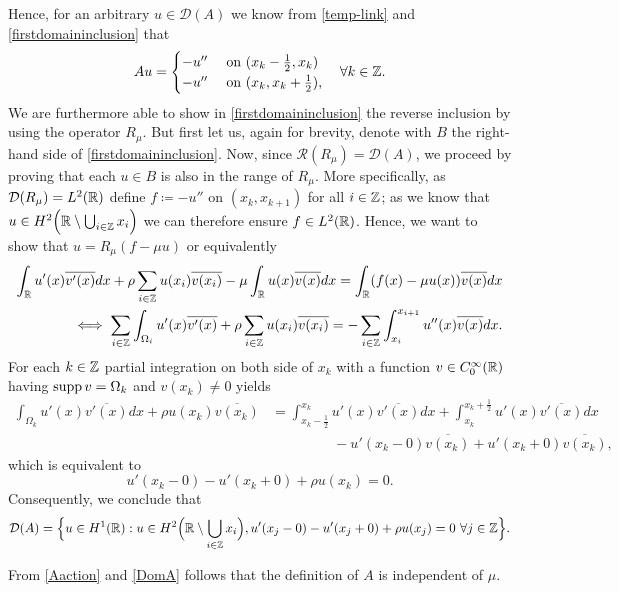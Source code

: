 Hence, for an arbitrary $u \in \mathcal{D}(A)$ we know from \eqref{temp-link} and \eqref{firstdomaininclusion} that
	\begin{equation}
		A u = \begin{cases}
					- u'' & \text{ on } (x_{k} - \frac{1}{2}, x_{k}) \\
					- u'' & \text{ on } (x_{k}, x_{k} + \frac{1}{2}),
			 \end{cases} \quad \forall k \in \mathbb{Z}. \label{Aaction}
	\end{equation} 
We are furthermore able to show in \eqref{firstdomaininclusion} the reverse inclusion by using the operator $R_{\mu}$. But first let us, again for brevity, denote with $B$ the right-hand side of \eqref{firstdomaininclusion}. Now, since $\mathcal{R}(R_{\mu}) = \mathcal{D}(A)$, we proceed by proving that each $u \in B$ is also in the range of $R_{\mu}$. More specifically, as $\mathcal{D}(R_{\mu}) = L^{2}(\mathbb{R})$ define $f \coloneqq - u''$ on $(x_{k}, x_{k + 1})$ for all $i \in \mathbb{Z}$; as we know that $u \in H^{2}\Big(\mathbb{R} \setminus \bigcup_{i \in \mathbb{Z}} x_{i} \Big)$ we can therefore ensure $f \in L^{2}(\mathbb{R})$. Hence, we want to show that $u = R_{\mu}(f - \mu u)$ or equivalently 
	\begin{align*}
		 \int_{\mathbb{R}} u'(x) \overline{v'(x)} dx + \rho \sum_{i \in \mathbb{Z}} u(x_{i}) \overline{v(x_{i})} - \mu \int_{\mathbb{R}} u(x) \overline{v(x)} dx = \int_{\mathbb{R}}(f(x)-\mu u(x)) \overline{v(x)} dx \\
		\iff \sum_{i \in \mathbb{Z}} \int_{\Omega_{i}} u'(x) \overline{v'(x)} + \rho \sum_{i \in \mathbb{Z}} u(x_{i}) \overline{v(x_{i})} = - \sum_{i \in \mathbb{Z}} \int_{x_{i}}^{x_{i+1}} u''(x) \overline{v(x)} dx.
	\end{align*}
For each $k \in \mathbb{Z}$ partial integration on both side of $x_{k}$ with a function $v \in C_{0}^{\infty}(\mathbb{R})$ having $\operatorname{supp} v = \Omega_{k}$ and $v(x_{k}) \neq 0$ yields
	\begin{align*}
		\int_{\Omega_{k}} u'(x) \overline{v'(x)} dx + \rho u(x_{k}) \overline{v(x_{k})} & = \int_{x_{k} - \frac{1}{2}}^{x_{k}} u'(x) \overline{v'(x)} dx + \int_{x_{k}}^{x_{k} +\frac{1}{2}} u'(x) \overline{v'(x)} dx \\
		& ~\qquad ~\qquad - u'(x_{k}-0) \overline{v(x_{k})}  + u'(x_{k}+0) \overline{v(x_{k})},
	\end{align*}
which is equivalent to
	\[ u'(x_{k}-0) - u'(x_{k}+0) + \rho u(x_{k}) = 0. \]
Consequently, we conclude that
	\begin{equation}
		\mathcal{D}(A) = \Big\{ u \in H^{1}(\mathbb{R}): u \in H^{2}\Big(\mathbb{R} \setminus \bigcup_{i \in \mathbb{Z}} x_{i} \Big), u'(x_{j} - 0) - u'(x_{j} + 0) + \rho u(x_{j}) = 0 ~\forall j \in \mathbb{Z} \Big\}. \label{DomA}
	\end{equation}
\begin{remark}
	From \eqref{Aaction} and \eqref{DomA} follows that the definition of $A$ is independent of $\mu$.
\end{remark}


